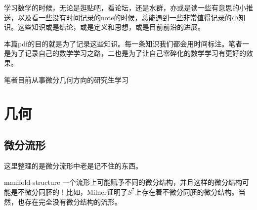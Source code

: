 \documentclass{package/fancy-book}
\begin{document}

\tableofcontents

\quad

学习数学的时候，无论是逛贴吧，看论坛，还是水群，亦或是读一些有意思的小推送，以及看一些没有时间记录的note的时候，总能遇到一些非常值得记录的小知识。这些知识或是结论，或是定义和思想，或是目前前沿的进展。

本篇pdf的目的就是为了记录这些知识。每一条知识我们都会用时间标注。笔者一是为了记录自己的数学学习之路，二也是为了让自己零碎化的数学学习有更好的效果。

笔者目前从事微分几何方向的研究生学习
\chapter{几何}
\section{微分流形}
这里整理的是微分流形中老是记不住的东西。
\begin{proposition}[流形的微分结构]{manifold-structure}
    一个流形上可能赋予不同的微分结构，并且这样的微分结构可能是不微分同胚的！比如，Milner证明了$S^7$上存在着不微分同胚的微分结构。当然，也存在完全没有微分结构的流形。
\end{proposition}
\end{document}
